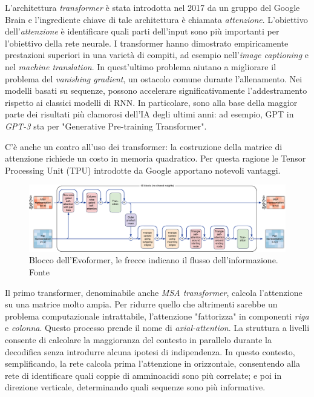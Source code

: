 \par L'architettura \textit{transformer} è stata introdotta nel 2017 da un gruppo del Google Brain\supercite{vaswani2017attention} e l'ingrediente chiave 
di tale architettura è chiamata \textit{attenzione}. L'obiettivo dell'\textit{attenzione} è identificare quali parti dell'input sono più importanti per l'obiettivo della rete neurale. I transformer hanno dimostrato empiricamente prestazioni superiori in una varietà di compiti, ad esempio nell'\textit{image captioning} e nel \textit{machine translation}. In quest'ultimo problema aiutano a migliorare il problema del \textit{vanishing gradient}, un ostacolo comune durante l'allenamento. Nei modelli basati su sequenze, possono accelerare significativamente l'addestramento rispetto ai classici modelli di RNN. In particolare, sono alla base della maggior parte dei risultati più clamorosi dell'IA degli ultimi anni: ad esempio, GPT in \textit{GPT-3} sta per "Generative Pre-training Transformer".

\par C'è anche un contro all'uso dei transformer: la costruzione della matrice di attenzione richiede un costo in memoria quadratico. Per questa ragione le Tensor Processing Unit (TPU) introdotte da Google apportano notevoli vantaggi.

\begin{figure}[!htb]
	\centering
	\includegraphics[scale=0.36]{images/evoformer.png}
	\caption{Blocco dell'Evoformer, le frecce indicano il flusso dell'informazione. Fonte\cite{jumper2021highly}}
	\label{fig:evoformer}
\end{figure}

\par Il primo transformer, denominabile anche \textit{MSA transformer}, calcola l'attenzione su una matrice molto ampia. Per ridurre quello che altrimenti sarebbe un problema computazionale intrattabile, l'attenzione "fattorizza" in componenti \textit{riga} e \textit{colonna}. Questo processo prende il nome di \textit{axial-attention}. La struttura a livelli consente di calcolare la maggioranza del contesto in parallelo durante la decodifica senza introdurre alcuna ipotesi di indipendenza. In questo contesto, semplificando, la rete calcola prima l'attenzione in orizzontale, consentendo alla rete di identificare quali coppie di amminoacidi sono più correlate; e poi in direzione verticale, determinando quali sequenze sono più informative. 

